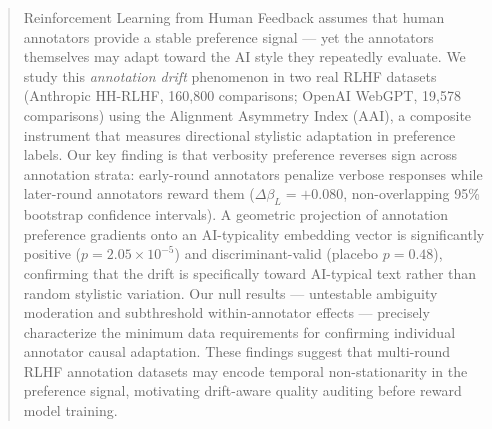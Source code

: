 \begin{abstract}
Reinforcement Learning from Human Feedback assumes that human annotators provide a stable preference signal --- yet the annotators themselves may adapt toward the AI style they repeatedly evaluate. We study this \emph{annotation drift} phenomenon in two real RLHF datasets (Anthropic HH-RLHF, 160,800 comparisons; OpenAI WebGPT, 19,578 comparisons) using the Alignment Asymmetry Index (AAI), a composite instrument that measures directional stylistic adaptation in preference labels. Our key finding is that verbosity preference reverses sign across annotation strata: early-round annotators penalize verbose responses while later-round annotators reward them ($\Delta\beta_L = +0.080$, non-overlapping 95\% bootstrap confidence intervals). A geometric projection of annotation preference gradients onto an AI-typicality embedding vector is significantly positive ($p = 2.05\times10^{-5}$) and discriminant-valid (placebo $p = 0.48$), confirming that the drift is specifically toward AI-typical text rather than random stylistic variation. Our null results --- untestable ambiguity moderation and subthreshold within-annotator effects --- precisely characterize the minimum data requirements for confirming individual annotator causal adaptation. These findings suggest that multi-round RLHF annotation datasets may encode temporal non-stationarity in the preference signal, motivating drift-aware quality auditing before reward model training.
\end{abstract}

